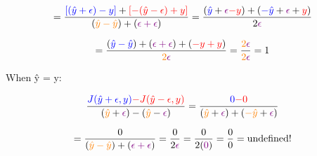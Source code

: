 \documentclass{article}
\begin{document}
\begin{displaymath}
=\frac{\textcolor{blue}{[(\hat{y}+\epsilon)-y]}+
\textcolor{red}{[-(\hat{y}-\epsilon)+y]}}
{(\textcolor{orange}{\hat{y}-\hat{y}})+(\textcolor{violet}{\epsilon+\epsilon})}
=\frac{(\textcolor{blue}{\hat{y}}+\textcolor{violet}{\epsilon}\textcolor{red}{-y})+
(\textcolor{blue}{-\hat{y}}+\textcolor{violet}{\epsilon}+\textcolor{red}{y})}
{2\textcolor{violet}{\epsilon}}
\end{displaymath}

\begin{displaymath}
=\frac{(\textcolor{blue}{\hat{y}-\hat{y}})+(\textcolor{violet}{\epsilon+\epsilon})+
(\textcolor{red}{-y+y})}{\textcolor{orange}{2}\textcolor{violet}{\epsilon}}
=\frac{\textcolor{orange}{2}\textcolor{violet}{\epsilon}}
{\textcolor{orange}{2}\textcolor{violet}{\epsilon}}
= 1
\end{displaymath}

\bigskip\bigskip\bigskip\bigskip
When ŷ = y:

\begin{displaymath}
\frac{\textcolor{blue}{J(\hat{y}+\epsilon, y)}
\textcolor{red}{-J(\hat{y}-\epsilon, y)}}
{(\textcolor{orange}{\hat{y}}+\textcolor{violet}{\epsilon})-(
\textcolor{orange}{\hat{y}}-\textcolor{violet}{\epsilon})}
=\frac{\textcolor{blue}{0}
\textcolor{red}{-0}}
{(\textcolor{orange}{\hat{y}}+\textcolor{violet}{\epsilon})+(
\textcolor{orange}{-\hat{y}}+\textcolor{violet}{\epsilon})}
\end{displaymath}

\begin{displaymath}
=\frac{0}{(\textcolor{orange}{\hat{y}-\hat{y}})+(\textcolor{violet}{\epsilon+\epsilon})}
=\frac{0}{2\textcolor{violet}{\epsilon}}
=\frac{0}{2(\textcolor{violet}{0})}
=\frac{0}{0}=\text{undefined!}
\end{displaymath}
\end{document}
